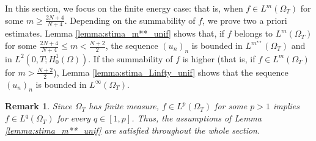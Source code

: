 \documentclass{amsart}
\numberwithin{equation}{section}
\newtheorem{remark}[example]{Remark}
\def\elle#1{L^{#1}}
\def\elleomT#1{L^{#1}(\Omega_T)}
\def\Hom{H^1_0(\Omega)}
\begin{document}
In this section, we focus on the finite energy case: that is, when $f\in\elleomT m$ for some $m\geq \frac{2N+4}{N+4}$. Depending on the summability of $f$, we prove two a priori estimates. 
Lemma \ref{lemma:stima_m**_unif} shows that, if $f$ belongs to $\elle m (\Omega_T)$ for some $\frac{2N+4}{N+4}\leq m<\frac{N+2}{2}$, the sequence  $(u_n)_n$ is bounded in $\elleomT {m^{\star\star}}$ and in $\elle2(0,T;\Hom)$. If the summability of $f$ is higher (that is, if $f\in\elleomT m$ for $m>\frac{N+2}{2}$), Lemma \ref{lemma:stima_Linfty_unif} shows that the sequence $(u_n)_n$ is bounded in $\elleomT \infty$.

\begin{remark}
    Since $\Omega_T$ has finite measure, $f\in\elleomT p$ for some $p>1$ implies $f\in \elleomT q$ for every $q\in [1,p]$. Thus, the assumptions of Lemma \ref{lemma:stima_m**_unif} are satisfied throughout the whole section.
\end{remark}
\end{document}

